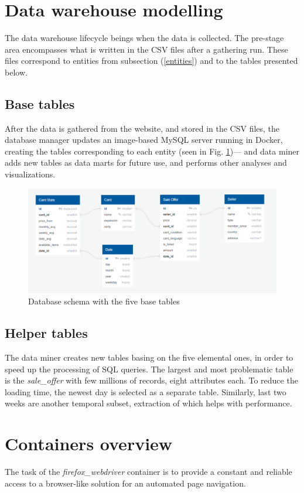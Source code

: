 \section{Data warehouse modelling}
The data warehouse lifecycle beings when the data is collected. The pre-stage area encompasses what is written in the CSV files after a gathering run. These files correspond to entities from subsection (\ref{entities}) and to the tables presented below.

\subsection{Base tables}
\label{ss:base_tables}
After the data is gathered from the website, and stored in the CSV files, the database manager updates an image-based MySQL server running in Docker, creating the tables corresponding to each entity (seen in Fig. \ref{fig:database})--- and data miner adds new tables as data marts for future use, and performs other analyses and visualizations.

\begin{figure}[ht]
    \centering
    \includegraphics[width=\textwidth]{figures/database.png}
    \caption{Database schema with the five base tables}
    \label{fig:database}
\end{figure}

\subsection{Helper tables}
The data miner creates new tables basing on the five elemental ones, in order to speed up the processing of SQL queries. The largest and most problematic table is the \textit{sale\_offer} with few millions of records, eight attributes each. To reduce the loading time, the newest day is selected as a separate table. Similarly, last two weeks are another temporal subset, extraction of which helps with performance.

\section{Containers overview}
The task of the \textit{firefox\_webdriver} container is to provide a constant and reliable access to a browser-like solution for an automated page navigation.

